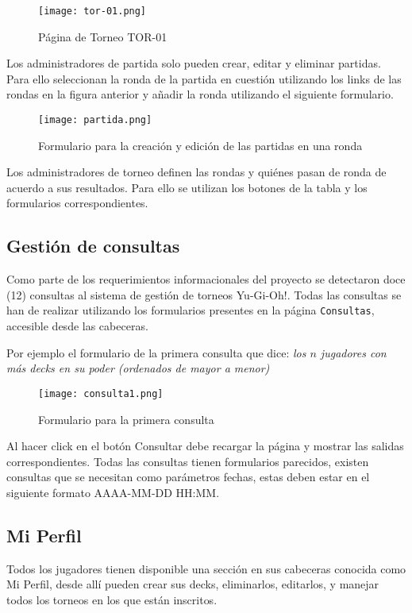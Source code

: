 \documentclass[12pt]{article}
\begin{document}
\begin{figure}[h!]
    \centering
    \texttt{[image: tor-01.png]}
    \caption{Página de Torneo TOR-01}
\end{figure}

Los administradores de partida solo pueden crear, editar y eliminar partidas. Para ello seleccionan la ronda de la  partida en cuestión utilizando los links de las rondas en la figura anterior y añadir la ronda utilizando el siguiente formulario.

\begin{figure}[h!]
    \centering
    \texttt{[image: partida.png]}
    \caption{Formulario para la creación y edición de las partidas en una ronda}
\end{figure}

Los administradores de torneo definen las rondas y quiénes pasan de ronda de acuerdo a sus resultados. Para ello se utilizan los botones de la tabla y los formularios correspondientes.

\subsection{Gestión de consultas}

Como parte de los requerimientos informacionales del proyecto se detectaron doce (12) consultas al sistema de gestión de torneos Yu-Gi-Oh!. Todas las consultas se han de realizar utilizando los formularios presentes en la página \verb|Consultas|, accesible desde las cabeceras. 

Por ejemplo el formulario de la primera consulta que dice:\textit{ los $n$ jugadores con más decks en su poder (ordenados de mayor a menor)}

\begin{figure}[h!]
    \centering
    \texttt{[image: consulta1.png]}
    \caption{Formulario para la primera consulta}
\end{figure}

 Al hacer click en el botón Consultar debe recargar la página y mostrar las salidas correspondientes. Todas las consultas tienen formularios parecidos, existen consultas que se necesitan como parámetros fechas, estas deben estar en el siguiente formato AAAA-MM-DD HH:MM.

\subsection{Mi Perfil}

Todos los jugadores tienen disponible una sección en sus cabeceras conocida como Mi Perfil, desde allí pueden crear sus decks, eliminarlos, editarlos, y manejar todos los torneos en los que están inscritos.
\end{document}
